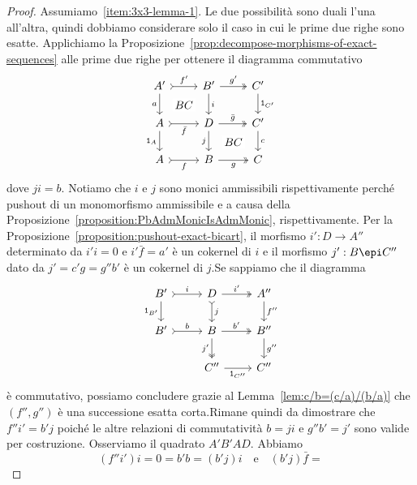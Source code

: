 \begin{proof}
  Assumiamo~\ref{item:3x3-lemma-1}. Le due possibilità sono duali l'una
  all'altra, quindi dobbiamo considerare solo il caso in cui le prime
  due righe sono esatte. Applichiamo la
  Proposizione~\ref{prop:decompose-morphisms-of-exact-sequences} alle
  prime due righe per ottenere il diagramma commutativo
  \[
    \begin{tikzcd}
      A' \ar["{a}", d, swap] \ar["{BC}" description, phantom, dr]
      \ar["{f'}", rightarrowtail, r] & B' \ar["{i}", d] \ar["{g'}",
      twoheadrightarrow, r] & C' \ar["{\id_{C'}}", d] \\
      A \ar["{\id_A}", d, swap] \ar["{\bar f}", rightarrowtail, r, swap]
      & D \ar["{j}", d, swap] \ar["{BC}" description, phantom, dr]
      \ar["{\bar g}", twoheadrightarrow, r] & C'
      \ar["c", d] \\
      A \ar["{f}", rightarrowtail, r, swap] & B \ar["{g}",
      twoheadrightarrow, r, swap] & C
    \end{tikzcd}
  \]
  dove \(ji = b\). Notiamo che \(i\) e \(j\) sono monici ammissibili
  rispettivamente perché pushout di un monomorfismo ammissibile e a
  causa della Proposizione~\ref{proposition:PbAdmMonicIsAdmMonic},
  rispettivamente. Per la
  Proposizione~\ref{proposition:pushout-exact-bicart}, il morfismo
  \(i': D \to A''\) determinato da \(i'i = 0\) e \(i'\bar{f} = a'\) è un
  cokernel di \(i\) e il morfismo \(j': B \epi C''\) dato da
  \(j' = c'g = g'' b'\) è un cokernel di \(j\).\newline Se sappiamo che
  il diagramma
  \[
    \begin{tikzcd}
      B' \ar["{\id_{B'}}", d, swap] \ar["{i}", rightarrowtail, r] & D
      \ar["{j}", rightarrowtail, d] \ar["{i'}",
      twoheadrightarrow, r] & A'' \ar["{f''}", d] \\
      B' \ar["{b}", rightarrowtail, r] & B \ar["{j'}",
      twoheadrightarrow, d, swap] \ar["{b'}",
      twoheadrightarrow, r] & B'' \ar["{g''}", d] \\
      & C'' \ar["{\id_{C''}}", r, swap] & C ''
    \end{tikzcd}
  \]
  è commutativo, possiamo concludere grazie al
  Lemma~\ref{lem:c/b=(c/a)/(b/a)} che \((f'',g'')\) è una successione
  esatta corta.\newline Rimane quindi da dimostrare che
  \(f'' i' = b' j\) poiché le altre relazioni di commutatività
  \(b = ji\) e \(g''b' = j'\) sono valide per costruzione. Osserviamo il
  quadrato \(A'B'AD\). Abbiamo
  \[
    (f'' i') i = 0 = b'b = (b'j) i \quad \text{e} \quad (b'j)\bar{f} =
\]
\end{proof}
